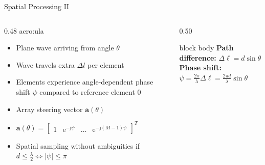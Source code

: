 \begin{frame}{Spatial Processing II}
  \begin{columns}[onlytextwidth]
    \begin{column}{0.48\textwidth}
      \Gls{acro:ula}
      \begin{itemize}
        \item Plane wave arriving from angle $\theta$
        \item Wave travels extra $\Delta l$ per element
        \item Elements experience angle-dependent phase shift $\psi$ compared to reference element 0
        \item Array steering vector $\mathbf{a}(\theta)$
        \item $\mathbf{a}(\theta) = \begin{bmatrix} 1 & \mathrm{e}^{-\mathrm{j}\psi} & \dots & \mathrm{e}^{-\mathrm{j}(M-1)\psi} \end{bmatrix}^T$
          \item Spatial sampling without ambiguities if $d \le \frac{\lambda}{2} \iff |\psi| \le \pi$
      \end{itemize}
    \end{column}

    \begin{column}{0.50\textwidth}
      \centering
      \resizebox{\linewidth}{!}{}

      \vspace{0.3em}
      \begin{beamercolorbox}[rounded=true,center,sep=3pt]{block body}
        \footnotesize
        \textbf{Path difference:} $\Delta \ell = d\sin\theta$ \\[2pt]
        \textbf{Phase shift:} $\psi = \frac{2\pi}{\lambda}\Delta \ell = \frac{2\pi d}{\lambda}\sin\theta$
      \end{beamercolorbox}
    \end{column}
  \end{columns}
\end{frame}

